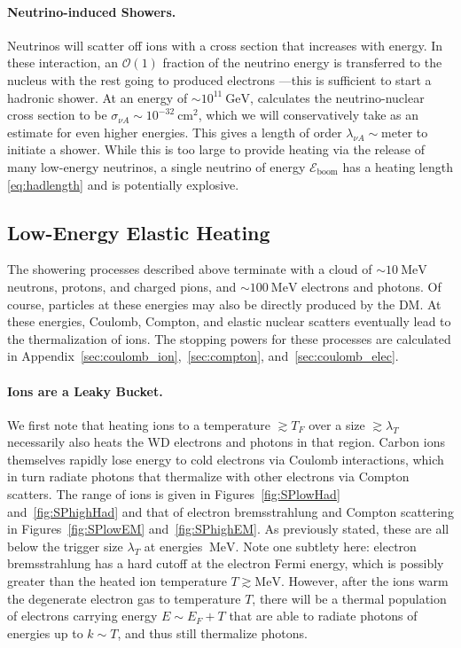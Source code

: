 \documentclass[twocolumn, preprintnumbers,amsmath,amssymb,prd, superscriptaddress]{revtex4}
\newcommand{\Eboom}{\mathcal{E}_\text{boom}}
\newcommand{\OO}{\mathcal{O}}
\newcommand{\GeV}{\text{GeV}}
\newcommand{\MeV}{\text{MeV}}
\newcommand{\cm}{\text{cm}}
\begin{document}
\paragraph{Neutrino-induced Showers.}
Neutrinos will scatter off ions with a cross section that increases with energy.
In these interaction, an $\OO(1)$ fraction of the neutrino energy is transferred to the nucleus with the rest going to produced electrons \cite{Formaggio:2013kya}---this is sufficient to start a hadronic shower.
At an energy of $\sim 10^{11} ~\GeV$, \cite{Formaggio:2013kya} calculates the neutrino-nuclear cross section to be $\sigma_{\nu A} \sim 10^{-32} ~\cm^2$, which we will conservatively take as an estimate for even higher energies.
This gives a length of order $\lambda_{\nu A} \sim \text{meter}$ to initiate a shower.
While this is too large to provide heating via the release of many low-energy neutrinos, a single neutrino of energy $\Eboom$ has a heating length \eqref{eq:hadlength} and is potentially explosive. 

\subsection{Low-Energy Elastic Heating}

The showering processes described above terminate with a cloud of $\sim 10~\MeV$ neutrons, protons, and charged pions, and $\sim 100~\MeV$ electrons and photons.
Of course, particles at these energies may also be directly produced by the DM.
At these energies, Coulomb, Compton, and elastic nuclear scatters eventually lead to the thermalization of ions.
The stopping powers for these processes are calculated in Appendix~\ref{sec:coulomb_ion},~\ref{sec:compton}, and~\ref{sec:coulomb_elec}. 

\paragraph{Ions are a Leaky Bucket.}
We first note that heating ions to a temperature $\gtrsim T_F$ over a size $\gtrsim \lambda_T$ necessarily also heats the WD electrons and photons in that region.
Carbon ions themselves rapidly lose energy to cold electrons via Coulomb interactions, which in turn radiate photons that thermalize with other electrons via Compton scatters.
The range of ions is given in Figures~\ref{fig:SPlowHad} and~\ref{fig:SPhighHad} and that of electron bremsstrahlung and Compton scattering in Figures~\ref{fig:SPlowEM} and~\ref{fig:SPhighEM}. 
As previously stated, these are all below the trigger size $\lambda_T$ at energies $~\MeV$.
Note one subtlety here: electron bremsstrahlung has a hard cutoff at the electron Fermi energy, which is possibly greater than the heated ion temperature $T \gtrsim \MeV$.
However, after the ions warm the degenerate electron gas to temperature $T$, there will be a thermal population of electrons carrying energy $E \sim E_F + T$ that are able to radiate photons of energies up to $k\sim T$, and thus still thermalize photons.
\end{document}
